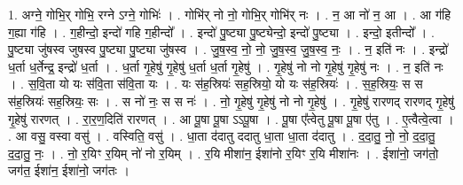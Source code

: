 \documentclass[17pt]{extarticle}
\begin{document}
1. अग्ने॒ गोभि॒र् गोभि॒ रग्ने ऽग्ने॒ गोभिः॑ । . गोभि॑र् नो नो॒ गोभि॒र् गोभि॑र् नः । . न॒ आ नो॑ न॒ आ । . आ ग॑हि ग॒ह्या ग॑हि । . ग॒हीन्दो॒ इन्दो॑ गहि ग॒हीन्दो᳚ । . इन्दो॑ पु॒ष्ट्या पु॒ष्ट्येन्दो॒ इन्दो॑ पु॒ष्ट्या । . इन्दो॒ इतीन्दो᳚ । . पु॒ष्ट्या जु॑षस्व जुषस्व पु॒ष्ट्या पु॒ष्ट्या जु॑षस्व । . जु॒ष॒स्व॒ नो॒ नो॒ जु॒ष॒स्व॒ जु॒ष॒स्व॒ नः॒ । . न॒ इति॑ नः । . इन्द्रो॑ ध॒र्ता ध॒र्तेन्द्र॒ इन्द्रो॑ ध॒र्ता । . ध॒र्ता गृ॒हेषु॑ गृ॒हेषु॑ ध॒र्ता ध॒र्ता गृ॒हेषु॑ । . गृ॒हेषु॑ नो नो गृ॒हेषु॑ गृ॒हेषु॑ नः । . न॒ इति॑ नः । . स॒वि॒ता यो यः स॑वि॒ता स॑वि॒ता यः । . यः स॑ह॒स्रियः॑ सह॒स्रियो॒ यो यः स॑ह॒स्रियः॑ । . स॒ह॒स्रियः॒ स स स॑ह॒स्रियः॑ सह॒स्रियः॒ सः । . स नो॑ नः॒ स स नः॑ । . नो॒ गृ॒हेषु॑ गृ॒हेषु॑ नो नो गृ॒हेषु॑ । . गृ॒हेषु॑ रारणद् रारणद् गृ॒हेषु॑ गृ॒हेषु॑ रारणत् । . रा॒र॒ण॒दिति॑ रारणत् । . आ पू॒षा पू॒षा ऽऽपू॒षा । . पू॒षा ए᳚त्वेतु पू॒षा पू॒षा ए॑तु । . ए॒त्वैत्वे॒त्वा । . आ वसु॒ वस्वा वसु॑ । . वस्विति॒ वसु॑ । . धा॒ता द॑दातु ददातु धा॒ता धा॒ता द॑दातु । . द॒दा॒तु॒ नो॒ नो॒ द॒दा॒तु॒ द॒दा॒तु॒ नः॒ । . नो॒ र॒यिꣳ र॒यिम् नो॑ नो र॒यिम् । . र॒यि मीशा॑न॒ ईशा॑नो र॒यिꣳ र॒यि मीशा॑नः । . ईशा॑नो॒ जग॑तो॒ जग॑त॒ ईशा॑न॒ ईशा॑नो॒ जग॑तः । \newline
\end{document}
